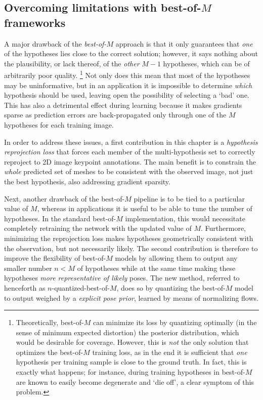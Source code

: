 
\subsection{Overcoming limitations with best-of-$M$ frameworks}

A major drawback of the \emph{best-of-$M$} approach is that it only guarantees that \emph{one} of the hypotheses lies close to the correct solution; however, it says nothing about the plausibility, or lack thereof, of the \emph{other} $M-1$ hypotheses, which can be of arbitrarily poor quality.
\footnote{
Theoretically, best-of-$M$ can minimize its loss by quantizing optimally (in the sense of minimum expected distortion) the posterior distribution, which would be desirable for coverage.
However, this is \emph{not} the only solution that optimizes the best-of-$M$ training loss, as in the end it is sufficient that \emph{one} hypothesis per training sample is close to the ground truth.
In fact, this is exactly what happens; for instance, during training hypotheses in best-of-$M$ are known to easily become degenerate and `die off', a clear symptom of this problem.
}
%
Not only does this mean that most of the hypotheses may be uninformative, but in an application it is impossible to determine \emph{which} hypothesis should be used, leaving open the possibility of selecting a `bad' one.
This has also a detrimental effect during learning because it makes gradients sparse as prediction errors are back-propagated only through one of the $M$ hypotheses for each training image.

In order to address these issues, a first contribution in this chapter is a \emph{hypothesis reprojection loss} that forces each member of the multi-hypothesis set to correctly reproject to 2D image keypoint annotations.
The main benefit is to constrain the \emph{whole} predicted set of meshes to be consistent with the observed image, not just the best hypothesis, also addressing gradient sparsity.

Next, another drawback of the best-of-{$M$} pipeline is to be tied to a particular value of $M$, whereas in applications it is useful to be able to tune the number of hypotheses. In the standard best-of-{$M$} implementation, this would necessitate completely retraining the network with the updated value of $M$. 
Furthermore, minimizing the reprojection loss makes hypotheses geometrically consistent with the observation, but not necessarily likely.
The second contribution is therefore to improve the flexibility of best-of-$M$ models by allowing them to output any smaller number $n<M$ of hypotheses while at the same time making these hypotheses \emph{more representative of likely} poses.
The new method, referred to henceforth as $n$-quantized-best-of-$M$, does so by quantizing the best-of-$M$ model to output weighed by a \emph{explicit pose prior}, learned by means of normalizing flows.

